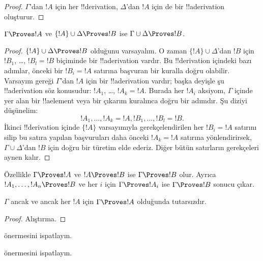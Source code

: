 \begin{proof}
$\Gamma$'dan $!A$ için her !!{derivation}, $\Delta$'dan $!A$ için de bir
!!a{derivation} oluşturur.
\end{proof}

\begin{prop}[Geçişlilik]
$\Gamma \Proves !A$ ve $\{!A\} \cup \Delta \Proves !B$ ise
$\Gamma \cup \Delta \Proves !B$.
\end{prop}

\begin{proof}
  $\{!A\} \cup \Delta \Proves !B$ olduğunu varsayalım. O zaman
  $\{!A\} \cup \Delta$'dan $!B$ için $!B_1$, \dots, $!B_l = !B$
  biçiminde bir !!a{derivation} vardır. Bu !!{derivation} içindeki bazı
  adımlar, önceki bir $!B_i = !A$ satırına başvuran bir kuralla doğru
  olabilir. Varsayım gereği $\Gamma$'dan $!A$ için bir !!a{derivation}
  vardır; başka deyişle şu !!a{derivation} söz konusudur:
  $!A_1$, \dots, $!A_k = !A$. Burada her $!A_i$ aksiyom, $\Gamma$ içinde
  yer alan bir !!a{element} veya bir çıkarım kuralınca doğru bir adımdır.
  Şu diziyi düşünelim:
  \[
  !A_1, \dots, !A_k = !A, !B_1, \dots, !B_l = !B.
  \]
  İkinci !!{derivation} içinde $\{!A\}$ varsayımıyla gerekçelendirilen her
  $!B_i=!A$ satırını silip bu satıra yapılan başvuruları daha önceki
  $!A_k=!A$ satırına yönlendirirsek, $\Gamma\cup\Delta$'dan $!B$ için doğru
  bir türetim elde ederiz. Diğer bütün satırların gerekçeleri aynen
  kalır.
\end{proof}

Özellikle $\Gamma \Proves !A$ ve $!A \Proves !B$ ise $\Gamma \Proves !B$
olur. Ayrıca $!A_1, \dots, !A_n \Proves !B$ ve her $i$ için
$\Gamma \Proves !A_i$ ise $\Gamma \Proves !B$ sonucu çıkar.

\begin{prop}
$\Gamma$ ancak ve ancak her $!A$ için $\Gamma \Proves !A$ olduğunda
tutarsızdır.
\end{prop}

\begin{proof}
Alıştırma.
\end{proof}

\begin{prob}
 önermesini ispatlayın.
\end{prob}
\tagendprob

\begin{prob}
 önermesini ispatlayın.
\end{prob}
\tagendprob

